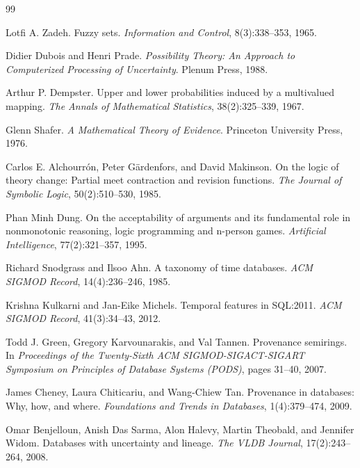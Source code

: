 \documentclass[a4paper,fleqn]{cas-sc}
\theoremstyle{plain}
\theoremstyle{remark}
\begin{document}
\begin{thebibliography}{99}

Lotfi A. Zadeh.
\newblock Fuzzy sets.
\newblock \emph{Information and Control}, 8(3):338--353, 1965.

Didier Dubois and Henri Prade.
\newblock \emph{Possibility Theory: An Approach to Computerized Processing of Uncertainty}.
\newblock Plenum Press, 1988.

Arthur P. Dempster.
\newblock Upper and lower probabilities induced by a multivalued mapping.
\newblock \emph{The Annals of Mathematical Statistics}, 38(2):325--339, 1967.

Glenn Shafer.
\newblock \emph{A Mathematical Theory of Evidence}.
\newblock Princeton University Press, 1976.

Carlos E. Alchourr{\'o}n, Peter G{\"a}rdenfors, and David Makinson.
\newblock On the logic of theory change: Partial meet contraction and revision functions.
\newblock \emph{The Journal of Symbolic Logic}, 50(2):510--530, 1985.

Phan Minh Dung.
\newblock On the acceptability of arguments and its fundamental role in nonmonotonic reasoning, logic programming and n-person games.
\newblock \emph{Artificial Intelligence}, 77(2):321--357, 1995.

Richard Snodgrass and Ilsoo Ahn.
\newblock A taxonomy of time databases.
\newblock \emph{ACM SIGMOD Record}, 14(4):236--246, 1985.

Krishna Kulkarni and Jan-Eike Michels.
\newblock Temporal features in SQL:2011.
\newblock \emph{ACM SIGMOD Record}, 41(3):34--43, 2012.

Todd J. Green, Gregory Karvounarakis, and Val Tannen.
\newblock Provenance semirings.
\newblock In \emph{Proceedings of the Twenty-Sixth ACM SIGMOD-SIGACT-SIGART Symposium on Principles of Database Systems (PODS)}, pages 31--40, 2007.

James Cheney, Laura Chiticariu, and Wang-Chiew Tan.
\newblock Provenance in databases: Why, how, and where.
\newblock \emph{Foundations and Trends in Databases}, 1(4):379--474, 2009.

Omar Benjelloun, Anish Das Sarma, Alon Halevy, Martin Theobald, and Jennifer Widom.
\newblock Databases with uncertainty and lineage.
\newblock \emph{The VLDB Journal}, 17(2):243--264, 2008.


\end{thebibliography}
\end{document}

